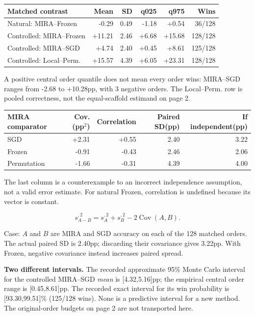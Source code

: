 \documentclass[10pt,letterpaper]{article}
\newcommand{\note}[1]{{\fontsize{8.5}{10.5}\selectfont #1\par}}
\newenvironment{clean}{\begin{center}\fontsize{9.5}{11.5}\selectfont\setlength{\tabcolsep}{6pt}\renewcommand{\arraystretch}{1.06}}{\end{center}}
\begin{document}
\par\noindent\begin{minipage}{\linewidth}\end{minipage}\par
\begin{clean}\begin{tabular}{@{}lrrrrr@{}}
\toprule
Matched contrast & Mean & SD & q025 & q975 & Wins \\
\midrule
Natural: MIRA--Frozen & -0.29 & 0.49 & -1.18 & +0.54 & 36/128 \\
Controlled: MIRA--Frozen & +11.21 & 2.46 & +6.68 & +15.68 & 128/128 \\
Controlled: MIRA--SGD & +4.74 & 2.40 & +0.45 & +8.61 & 125/128 \\
Controlled: Local--Perm. & +15.57 & 4.39 & +6.05 & +23.31 & 128/128 \\
\bottomrule\end{tabular}\end{clean}
\note{A positive central order quantile does not mean every order wins: MIRA--SGD ranges from -2.68 to +10.28pp, with 3 negative orders. The Local--Perm. row is pooled correctness, not the equal-scaffold estimand on page 2.}
\par\noindent\begin{minipage}{\linewidth}\end{minipage}\par
\begin{clean}\begin{tabular}{@{}lrrrr@{}}
\toprule
MIRA comparator & Cov.(pp$^2$) & Correlation & Paired SD(pp) & If independent(pp) \\
\midrule
SGD & +2.31 & +0.55 & 2.40 & 3.22 \\
Frozen & -0.91 & -0.43 & 2.46 & 2.06 \\
Permutation & -1.66 & -0.31 & 4.39 & 4.00 \\
\bottomrule\end{tabular}\end{clean}
\note{The last column is a counterexample to an incorrect independence assumption, not a valid error estimate. For natural Frozen, correlation is undefined because its vector is constant.}
$$s_{A-B}^{,2}=s_A^{,2}+s_B^{,2}-2\operatorname{Cov}(A,B).$$
\note{Case: $A$ and $B$ are MIRA and SGD accuracy on each of the 128 matched orders.
The actual paired SD is 2.40pp; discarding their covariance gives 3.22pp.
With Frozen, negative covariance instead increases paired spread.}
\textbf{Two different intervals.} The recorded approximate 95\% Monte Carlo interval for the
controlled MIRA--SGD \emph{mean} is [4.32,5.16]pp; the empirical central order range is [0.45,8.61]pp.
The recorded exact interval for its win probability is [93.30,99.51]\% (125/128 wins).
None is a predictive interval for a new method. The original-order budgets on page 2 are not transported here.
\end{document}
